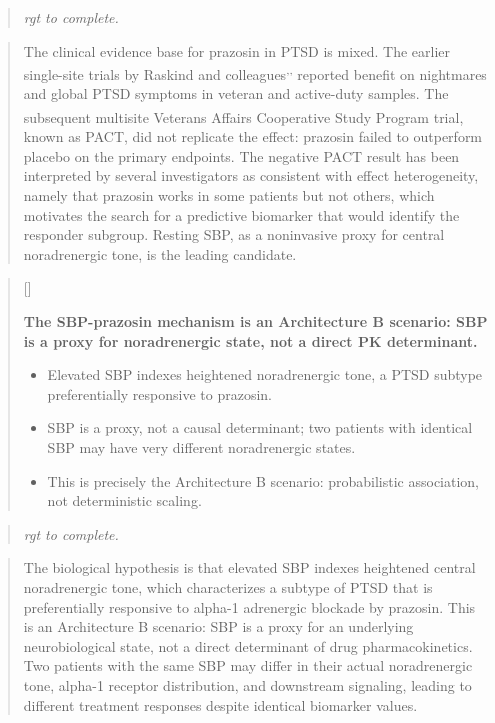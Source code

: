 \documentclass[
  11pt,
]{article}
\newcounter{pgraph}
\newenvironment{bullets}{%
  \stepcounter{pgraph}%
  \begin{quote}\small\sffamily\color[gray]{0.30}%
  {\normalfont\scriptsize\color[gray]{0.58}[\thepgraph]\enspace}}{%
  \end{quote}}
\newenvironment{rgt}{%
  \begin{quote}\small\itshape\color[RGB]{20,60,160}}{%
  \end{quote}}
\newenvironment{orig}{%
  \begin{quote}\normalsize\color[gray]{0.55}}{%
  \end{quote}}
\begin{document}
\begin{rgt}
rgt to complete.

\end{rgt}

\begin{orig}
The clinical evidence base for prazosin in PTSD is mixed. The earlier
single-site trials by Raskind and
colleagues\textsuperscript{,,}
reported benefit on nightmares and global PTSD symptoms in veteran and
active-duty samples. The subsequent multisite Veterans Affairs
Cooperative Study Program
trial\textsuperscript{}, known as PACT,
did not replicate the effect: prazosin failed to outperform placebo on
the primary endpoints. The negative PACT result has been interpreted by
several investigators as consistent with effect heterogeneity, namely
that prazosin works in some patients but not others, which motivates the
search for a predictive biomarker that would identify the responder
subgroup. Resting SBP, as a noninvasive proxy for central noradrenergic
tone, is the leading candidate.

\end{orig}

\begin{bullets}

\textbf{The SBP-prazosin mechanism is an Architecture B
scenario: SBP is a proxy for noradrenergic state, not a direct
PK determinant.}

\begin{itemize}\setlength{\itemsep}{2pt}\setlength{\parskip}{0pt}
\item Elevated SBP indexes heightened noradrenergic tone, a
  PTSD subtype preferentially responsive to prazosin.
\item SBP is a proxy, not a causal determinant; two patients
  with identical SBP may have very different noradrenergic
  states.
\item This is precisely the Architecture B scenario:
  probabilistic association, not deterministic scaling.
\end{itemize}

\end{bullets}

\begin{rgt}
rgt to complete.

\end{rgt}

\begin{orig}
The biological hypothesis is that elevated SBP indexes heightened
central noradrenergic tone, which characterizes a subtype of PTSD that
is preferentially responsive to alpha-1 adrenergic blockade by prazosin.
This is an Architecture B scenario: SBP is a proxy for an underlying
neurobiological state, not a direct determinant of drug
pharmacokinetics. Two patients with the same SBP may differ in their
actual noradrenergic tone, alpha-1 receptor distribution, and downstream
signaling, leading to different treatment responses despite identical
biomarker values.

\end{orig}
\end{document}
